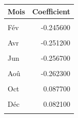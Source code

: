 \centering
\centering
\begin{tabular}[t]{lr}
\toprule
Mois & Coefficient\\
\midrule
\cellcolor{gray!10}{Jan} & \cellcolor{gray!10}{-0.242800}\\
Fév & -0.245600\\
\cellcolor{gray!10}{Mar} & \cellcolor{gray!10}{-0.248400}\\
Avr & -0.251200\\
\cellcolor{gray!10}{Mai} & \cellcolor{gray!10}{-0.254000}\\
Jun & -0.256700\\
\cellcolor{gray!10}{Jul} & \cellcolor{gray!10}{-0.259500}\\
Aoû & -0.262300\\
\cellcolor{gray!10}{Sep} & \cellcolor{gray!10}{-0.265100}\\
Oct & 0.087700\\
\cellcolor{gray!10}{Nov} & \cellcolor{gray!10}{0.084900}\\
Déc & 0.082100\\
\cellcolor{gray!10}{Somme} & \cellcolor{gray!10}{-2.030994}\\
\bottomrule
\end{tabular}

